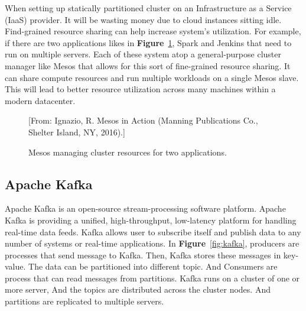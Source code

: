 \documentclass[12pt,oneside,openright,a4paper]{cpe-english-project}
\begin{document}
\hspace{10mm}When setting up statically partitioned cluster on an Infrastructure as a Service (IaaS) provider. It will be wasting money due to cloud instances sitting idle. Find-grained resource sharing can help increase system’s utilization. For example, if there are two applications likes in \textbf{Figure}~\ref{fig:spark}, Spark and Jenkins that need to run on multiple servers. Each of these system atop a general-purpose cluster manager like Mesos that allows for this sort of fine-grained resource sharing. It can share compute resources and run multiple workloads on a single Mesos slave. This will lead to better resource utilization across many machines within a modern datacenter.\cite{mesosInAction}

\begin{figure}[!h]\centering
  \setlength{\fboxrule}{0mm} %
  \setlength{\fboxsep}{0cm}
  \caption{Mesos managing cluster resources for two applications.}\label{fig:spark}
  [From: Ignazio, R. Mesos in Action (Manning Publications Co., Shelter Island, NY, 2016).]
\end{figure}

\newpage

\subsection{Apache Kafka}
\hspace{10mm}Apache Kafka is an open-source stream-processing software platform. Apache Kafka is providing a unified, high-throughput, low-latency platform for handling real-time data feeds. Kafka allows user to subscribe itself and publish data to any number of systems or real-time applications. In \textbf{Figure}~\ref{fig:kafka}, producers are processes that send message to Kafka. Then, Kafka stores these messages in key-value. The data can be partitioned into different topic. And Consumers are process that can read messages from partitions. Kafka runs on a cluster of one or more server, And the topics are distributed across the cluster nodes. And partitions are replicated to multiple servers.\cite{kafka}
\end{document}

